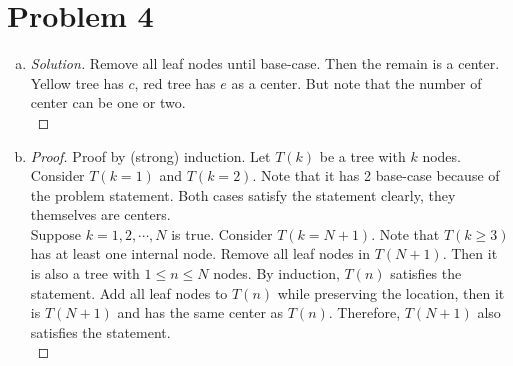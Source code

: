 \section*{Problem 4}
	\begin{enumerate}[(a)]
		\item \begin{proof} [Solution]
			Remove all leaf nodes until base-case. Then the remain is a center. Yellow tree has $c$, red tree has $e$ as a center. But note that the number of center can be one or two.\\
		\end{proof}
		\item \begin{proof}
			Proof by (strong) induction. Let $T(k)$ be a tree with $k$ nodes. Consider $T(k = 1)$ and $T(k = 2)$. Note that it has 2 base-case because of the problem statement. Both cases satisfy the statement clearly, they themselves are centers.\\
			Suppose $k = 1,2,\cdots,N$ is true. Consider $T(k=N+1)$. Note that $T(k\geq3)$ has at least one internal node. Remove all leaf nodes in $T(N+1)$. Then it is also a tree with $1\leq n\leq N$ nodes. By induction, $T(n)$ satisfies the statement. Add all leaf nodes to $T(n)$ while preserving the location, then it is $T(N+1)$ and has the same center as $T(n)$. Therefore, $T(N+1)$ also satisfies the statement.\\
		\end{proof}
	\end{enumerate}